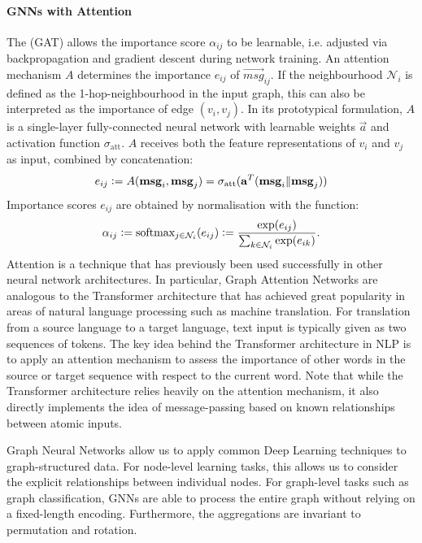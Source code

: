 \documentclass[
	fontsize=10pt, %
	twoside=false, %
	secnumdepth=1, %
  toc=indentunnumbered %
]{kaobook}
\begin{document}
\paragraph{GNNs with Attention} The  (GAT)
\cite{velickovic_graph_2018} allows the importance score $\alpha_{ij}$ to be learnable, i.e.
adjusted via backpropagation and gradient descent during network training. An
attention mechanism $A$ determines the importance $e_{ij}$ of $\vec{msg}_{ij}$.
If the neighbourhood $\mathcal{N}_i$ is defined as the 1-hop-neighbourhood in
the input graph, this can also be interpreted as the importance of edge $(v_i,
v_j)$. In its prototypical formulation, $A$ is a single-layer fully-connected
neural network with learnable weights $\vec a$ and activation function
$\sigma_{\text{att}}$. $A$ receives
both the feature representations of $v_i$ and $v_j$ as input, combined by
concatenation:
\begin{align}
  e_{ij} := A(\mathbf{msg}_i, \mathbf{msg}_j) = \sigma_{\text{att}}(\mathbf{a}^T( \mathbf{msg}_i \| \mathbf{msg}_j))
  \label{eq:graph-attention}
\end{align}
Importance scores $e_{ij}$ are obtained by normalisation with the  function:
\begin{align}
  \alpha_{ij} := \text{softmax}_{j \in \mathcal{N}_i}(e_{ij}) := \frac{\exp(e_{ij})}{\sum_{k \in \mathcal{N}_i} \exp(e_{ik})}.
  \label{eq:softmax}
\end{align}
Attention is a technique that has previously been used successfully in other
neural network architectures. In particular, Graph Attention Networks are
analogous to the Transformer architecture \cite{vaswani_AttentionAllYou_2017}
that has achieved great popularity in areas of natural language processing such as machine translation.
For translation from a source language
to a target language, text input is typically given as two sequences of tokens.
The key idea behind the Transformer architecture in NLP is to apply an attention
mechanism to assess the importance of other words in the source or target
sequence with respect to the current word.
Note that while the Transformer architecture relies heavily on the attention
mechanism, it also directly implements the idea of message-passing based on
known relationships between atomic inputs.

Graph Neural Networks allow us to apply common Deep Learning techniques to
graph-structured data. For node-level learning tasks, this allows us to consider
the explicit relationships between individual nodes. For graph-level tasks such
as graph classification, GNNs are able to process the entire graph without
relying on a fixed-length encoding. Furthermore, the aggregations are invariant
to permutation and rotation.
\end{document}
